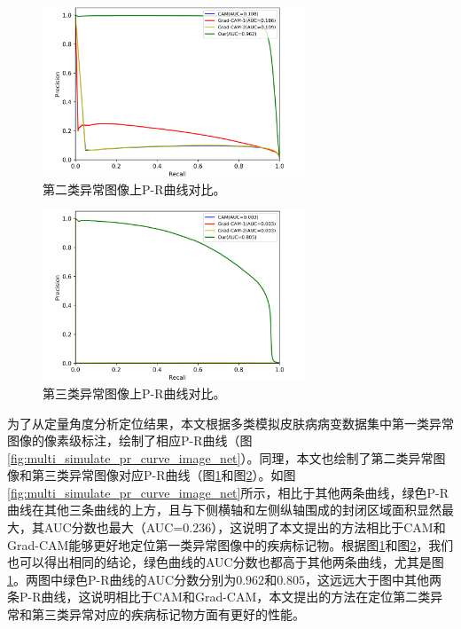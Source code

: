 \begin{figure}[H]
	\centering
	\includegraphics[width=0.7\textwidth]{figure/pr_curve_multi_skin/SKIN_pr_curve.png}
	\caption[第二类异常图像上P-R曲线对比]{第二类异常图像上P-R曲线对比。} 
	\label{fig:multi_simulate_pr_curve_skin}
\end{figure}
\begin{figure}[H]
	\centering
	\includegraphics[width=0.7\textwidth]{figure/pr_curve_multi_skin/CIRCLE_pr_curve.png}
	\caption[第三类异常图像上P-R曲线对比]{第三类异常图像上P-R曲线对比。}
	\label{fig:multi_simulate_pr_curve_circle}
\end{figure}

为了从定量角度分析定位结果，本文根据多类模拟皮肤病病变数据集中第一类异常图像的像素级标注，绘制了相应P-R曲线（图\ref{fig:multi_simulate_pr_curve_image_net}）。同理，本文也绘制了第二类异常图像和第三类异常图像对应P-R曲线（图\ref{fig:multi_simulate_pr_curve_skin}和图\ref{fig:multi_simulate_pr_curve_circle}）。如图\ref{fig:multi_simulate_pr_curve_image_net}所示，相比于其他两条曲线，绿色P-R曲线在其他三条曲线的上方，且与下侧横轴和左侧纵轴围成的封闭区域面积显然最大，其AUC分数也最大（AUC=$0.236$），这说明了本文提出的方法相比于CAM和Grad-CAM能够更好地定位第一类异常图像中的疾病标记物。根据图\ref{fig:multi_simulate_pr_curve_skin}和图\ref{fig:multi_simulate_pr_curve_circle}，我们也可以得出相同的结论，绿色曲线的AUC分数也都高于其他两条曲线，尤其是图\ref{fig:multi_simulate_pr_curve_skin}。两图中绿色P-R曲线的AUC分数分别为$0.962$和$0.805$，这远远大于图中其他两条P-R曲线，这说明相比于CAM和Grad-CAM，本文提出的方法在定位第二类异常和第三类异常对应的疾病标记物方面有更好的性能。


